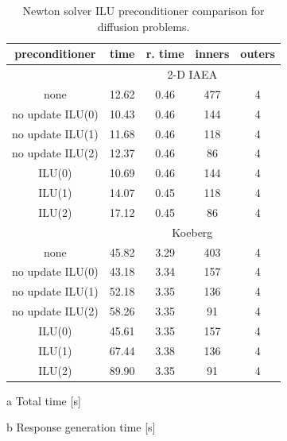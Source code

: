 \begin{table}[ht] 
 
 \begin{center} 
  \caption{Newton solver ILU preconditioner comparison for diffusion 
          problems.} 
 \label{tbl:diffusion_newton_pc_study}
 \begin{threeparttable}

 \begin{tabular}{ccccc} 
 \toprule 
  preconditioner & time\tnote{a} & r. time\tnote{b} & inners & outers \\
 \midrule 
 &  \multicolumn{4}{c}{2-D IAEA} \\ 
 \midrule 
          none &     12.62 &      0.46 &          477 &            4 \\ 
  no update ILU(0) &     10.43 &      0.46 &          144 &            4 \\ 
  no update ILU(1) &     11.68 &      0.46 &          118 &            4 \\ 
  no update ILU(2) &     12.37 &      0.46 &           86 &            4 \\ 
        ILU(0) &     10.69 &      0.46 &          144 &            4 \\ 
        ILU(1) &     14.07 &      0.45 &          118 &            4 \\ 
        ILU(2) &     17.12 &      0.45 &           86 &            4 \\ 
 \midrule 
 &  \multicolumn{4}{c}{Koeberg} \\ 
 \midrule 
          none &     45.82 &      3.29 &          403 &            4 \\ 
  no update ILU(0) &     43.18 &      3.34 &          157 &            4 \\ 
  no update ILU(1) &     52.18 &      3.35 &          136 &            4 \\ 
  no update ILU(2) &     58.26 &      3.35 &           91 &            4 \\ 
        ILU(0) &     45.61 &      3.35 &          157 &            4 \\ 
        ILU(1) &     67.44 &      3.38 &          136 &            4 \\ 
        ILU(2) &     89.90 &      3.35 &           91 &            4 \\ 
 \bottomrule 
 \end{tabular} 
 

 {\footnotesize
 \begin{tablenotes}
   \item[a] Total time [s]
   \item[b] Response generation time [s]
 \end{tablenotes}
 }
 \end{threeparttable}
 
 
 \end{center} 

\end{table} 

